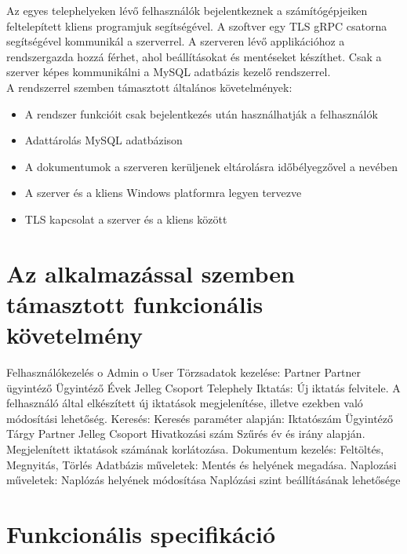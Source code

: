 \documentclass[
]{thesis-ekf}
\theoremstyle{definition}
\theoremstyle{remark}
\begin{document}
Az egyes telephelyeken lévő felhasználók bejelentkeznek a számítógépjeiken feltelepített kliens programjuk segítségével. A szoftver egy TLS gRPC csatorna segítségével kommunikál a szerverrel. A szerveren lévő applikációhoz a rendszergazda hozzá férhet, ahol beállításokat és mentéseket készíthet. Csak a szerver képes kommunikálni a MySQL adatbázis kezelő rendszerrel.\\
A rendszerrel szemben támasztott általános követelmények:
\begin{itemize}
	\item A rendszer funkcióit csak bejelentkezés után használhatják a felhasználók
	\item Adattárolás MySQL adatbázison
	\item A dokumentumok a szerveren kerüljenek eltárolásra időbélyegzővel a nevében
	\item A szerver és a kliens Windows platformra legyen tervezve
	\item TLS kapcsolat a szerver és a kliens között
\end{itemize}
\section{Az alkalmazással szemben támasztott funkcionális követelmény}
Felhasználókezelés
o	Admin
o	User
Törzsadatok kezelése:
Partner
Partner ügyintéző
Ügyintéző
Évek
Jelleg
Csoport
Telephely
Iktatás:
Új iktatás felvitele. A felhasználó által elkészített új iktatások megjelenítése, illetve ezekben való módosítási lehetőség.
Keresés:
Keresés paraméter alapján:
Iktatószám
Ügyintéző
Tárgy
Partner
Jelleg
Csoport
Hivatkozási szám
Szűrés év és irány alapján.
Megjelenített iktatások számának korlátozása.
Dokumentum kezelés:
Feltöltés, Megnyitás, Törlés
Adatbázis műveletek:
Mentés és helyének megadása.
Naplozási műveletek:
Naplózás helyének módosítása
Naplózási szint beállításának lehetősége
\section{Funkcionális specifikáció}
\end{document}
